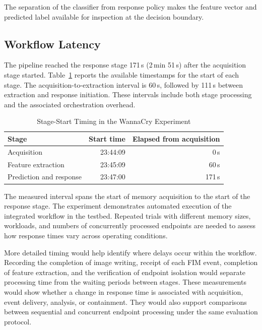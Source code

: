\documentclass[conference]{IEEEtran}
\begin{document}
The separation of the classifier from response policy makes the feature vector and predicted label available for inspection at the decision boundary.

\subsection{Workflow Latency}
The pipeline reached the response stage 171\,s (2\,min 51\,s) after the acquisition stage started. Table~\ref{tab:timing} reports the available timestamps for the start of each stage. The acquisition-to-extraction interval is 60\,s, followed by 111\,s between extraction and response initiation. These intervals include both stage processing and the associated orchestration overhead.

\begin{table}[t]
\caption{Stage-Start Timing in the WannaCry Experiment}
\label{tab:timing}
\centering
\small
\begin{tabular}{@{}lrr@{}}
\toprule
Stage & Start time & Elapsed from acquisition \\
\midrule
Acquisition & 23:44:09 & 0\,s \\
Feature extraction & 23:45:09 & 60\,s \\
Prediction and response & 23:47:00 & 171\,s \\
\bottomrule
\end{tabular}
\par\smallskip
\begin{minipage}{\columnwidth}\footnotesize
\end{minipage}
\end{table}

The measured interval spans the start of memory acquisition to the start of the response stage.
The experiment demonstrates automated execution of the integrated workflow in the testbed. Repeated trials with different memory sizes, workloads, and numbers of concurrently processed endpoints are
needed to assess how response times vary across operating conditions.

More detailed timing would help identify where delays occur within the workflow. Recording the completion of image writing, receipt of each FIM event, completion of feature extraction, and the verification of endpoint isolation would separate processing time from the waiting periods between stages. These measurements would show whether a change in response time is associated with acquisition, event delivery, analysis, or containment. They would also support comparisons between sequential and concurrent endpoint processing under the same evaluation protocol.
\end{document}
